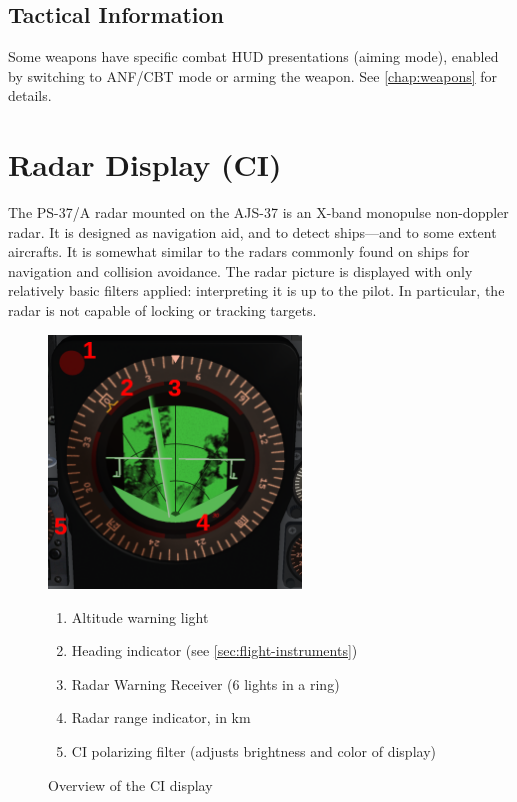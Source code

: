 \subsection{Tactical Information}
Some weapons have specific combat HUD presentations (aiming mode),
enabled by switching to ANF/CBT mode or arming the weapon.
See \cref{chap:weapons} for details.


\section{Radar Display (CI)}
The PS-37/A radar mounted on the AJS-37 is an X-band monopulse non-doppler radar.
It is designed as navigation aid, and to detect ships---and to some extent aircrafts.
It is somewhat similar to the radars commonly found on ships for navigation and collision avoidance.
The radar picture is displayed with only relatively basic filters applied:
interpreting it is up to the pilot.
In particular, the radar is not capable of locking or tracking targets.

\begin{figure}[!ht]
  \centering
  \includegraphics[width=0.6\textwidth]{images/displays/CI-overview.png}

  \begin{enumerate}[nosep]
    \item \label{item:alt-warning} Altitude warning light
    \item \label{item:heading-CI} Heading indicator (see \cref{sec:flight-instruments})
    \item \label{item:rwr-lights} Radar Warning Receiver (6 lights in a ring)
    \item \label{item:radar-range} Radar range indicator, in km
    \item \label{item:CI-polaroid-filter} CI polarizing filter (adjusts brightness and color of display)
  \end{enumerate}

  \caption{Overview of the CI display}
  \label{fig:CI}
\end{figure}

